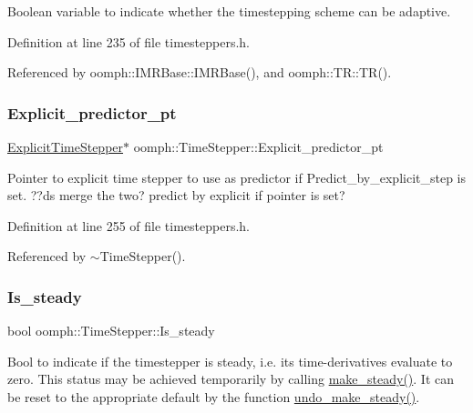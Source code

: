 Boolean variable to indicate whether the timestepping scheme can be adaptive. 



Definition at line 235 of file timesteppers.\+h.



Referenced by oomph\+::\+I\+M\+R\+Base\+::\+I\+M\+R\+Base(), and oomph\+::\+T\+R\+::\+T\+R().

\mbox{\label{classoomph_1_1TimeStepper_a41f408e1a313ae5b1806c3a306d720a2}} 
\subsubsection{\texorpdfstring{Explicit\+\_\+predictor\+\_\+pt}{Explicit\_predictor\_pt}}
{\footnotesize\ttfamily \hyperlink{classoomph_1_1ExplicitTimeStepper}{Explicit\+Time\+Stepper}$\ast$ oomph\+::\+Time\+Stepper\+::\+Explicit\+\_\+predictor\+\_\+pt\hspace{0.3cm}{\ttfamily [protected]}}

Pointer to explicit time stepper to use as predictor if Predict\+\_\+by\+\_\+explicit\+\_\+step is set. ??ds merge the two? predict by explicit if pointer is set? 

Definition at line 255 of file timesteppers.\+h.



Referenced by $\sim$\+Time\+Stepper().

\mbox{\label{classoomph_1_1TimeStepper_a5a23db485d16d7f9598c011850d0563f}} 
\subsubsection{\texorpdfstring{Is\+\_\+steady}{Is\_steady}}
{\footnotesize\ttfamily bool oomph\+::\+Time\+Stepper\+::\+Is\+\_\+steady\hspace{0.3cm}{\ttfamily [protected]}}



Bool to indicate if the timestepper is steady, i.\+e. its time-\/derivatives evaluate to zero. This status may be achieved temporarily by calling \hyperlink{classoomph_1_1TimeStepper_a81ea0ff2e66cef5e0184b616c608e418}{make\+\_\+steady()}. It can be reset to the appropriate default by the function \hyperlink{classoomph_1_1TimeStepper_aada05f89e86aae352bd5b32bfb173b18}{undo\+\_\+make\+\_\+steady()}. 




